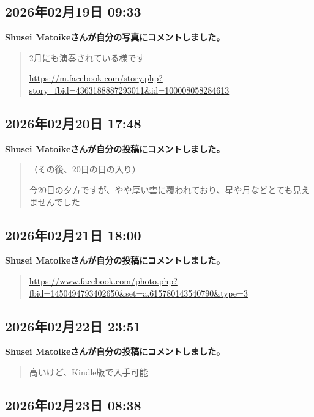 \subsection*{2026年02月19日 09:33}

\textbf{Shusei Matoikeさんが自分の写真にコメントしました。}

\begin{quote}
2月にも演奏されている様です

\url{https://m.facebook.com/story.php?story_fbid=4363188887293011&id=100008058284613}
\end{quote}

\subsection*{2026年02月20日 17:48}

\textbf{Shusei Matoikeさんが自分の投稿にコメントしました。}

\begin{quote}
（その後、20日の日の入り）

今20日の夕方ですが、やや厚い雲に覆われており、星や月などとても見えませんでした
\end{quote}

\subsection*{2026年02月21日 18:00}

\textbf{Shusei Matoikeさんが自分の投稿にコメントしました。}

\begin{quote}
\url{https://www.facebook.com/photo.php?fbid=1450494793402650&set=a.615780143540790&type=3}
\end{quote}

\subsection*{2026年02月22日 23:51}

\textbf{Shusei Matoikeさんが自分の投稿にコメントしました。}

\begin{quote}
高いけど、Kindle版で入手可能
\end{quote}

\subsection*{2026年02月23日 08:38}

